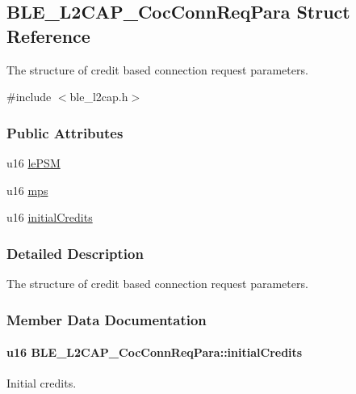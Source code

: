 \hypertarget{struct_b_l_e___l2_c_a_p___coc_conn_req_para}{}\subsection{B\+L\+E\+\_\+\+L2\+C\+A\+P\+\_\+\+Coc\+Conn\+Req\+Para Struct Reference}
\label{struct_b_l_e___l2_c_a_p___coc_conn_req_para}


The structure of credit based connection request parameters.  




{\ttfamily \#include $<$ble\+\_\+l2cap.\+h$>$}

\subsubsection*{Public Attributes}
\begin{DoxyCompactItemize}
\item 
u16 \hyperlink{struct_b_l_e___l2_c_a_p___coc_conn_req_para_a7fa7ae295dfb16c1402776ed47943708}{le\+P\+SM}
\item 
u16 \hyperlink{struct_b_l_e___l2_c_a_p___coc_conn_req_para_a5f87d443a26ffe7d2e5be3eb9acf6ead}{mps}
\item 
u16 \hyperlink{struct_b_l_e___l2_c_a_p___coc_conn_req_para_abca92e77104b4a49337474ea011ac05b}{initial\+Credits}
\end{DoxyCompactItemize}


\subsubsection{Detailed Description}
The structure of credit based connection request parameters. 

\subsubsection{Member Data Documentation}
\paragraph[{\texorpdfstring{initial\+Credits}{initialCredits}}]{\setlength{\rightskip}{0pt plus 5cm}u16 B\+L\+E\+\_\+\+L2\+C\+A\+P\+\_\+\+Coc\+Conn\+Req\+Para\+::initial\+Credits}\hypertarget{struct_b_l_e___l2_c_a_p___coc_conn_req_para_abca92e77104b4a49337474ea011ac05b}{}\label{struct_b_l_e___l2_c_a_p___coc_conn_req_para_abca92e77104b4a49337474ea011ac05b}
Initial credits. 
